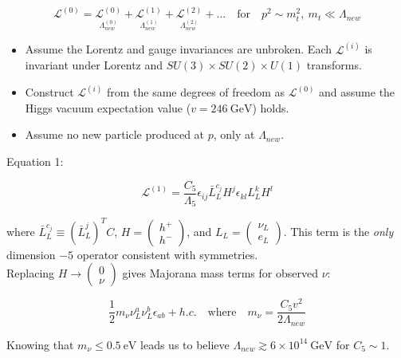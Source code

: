 \documentclass[10pt]{article}
\begin{document}
	\begin{equation}
	\mathcal{L}^{(0)} = \underset{\Lambda_{new}^{(0)}}{\mathcal{L}^{(0)}} + \underset{\Lambda_{new}^{(1)}}{\mathcal{L}^{(1)}} + \underset{\Lambda_{new}^{(2)}}{\mathcal{L}^{(2)}} + \ldots \quad \text{for}\quad p^2\sim m_t^2,\: m_t\ll\Lambda_{new}
	\end{equation}
	
	\begin{itemize}
		\item Assume the Lorentz and gauge invariances are unbroken. Each $\mathcal{L}^{(i)}$ is invariant under Lorentz and $SU(3)\times SU(2)\times U(1)$ transforms.
		\item Construct $\mathcal{L}^{(i)}$ from the same degrees of freedom as $\mathcal{L}^{(0)}$ and assume the Higgs vacuum expectation value ($v=246\:\text{GeV}$) holds.
		\item Assume no new particle produced at $p$, only at $\Lambda_{new}$.
	\end{itemize}
	
	Equation 1:
	
	\begin{equation}
		\mathcal{L}^{(1)} = \frac{C_5}{\Lambda_5}\epsilon_{ij}\bar{L}_L^{c_j}H^j\epsilon_{kl}L_L^kH^l
	\end{equation}
	
	where $\bar{L}_L^{c_j} \equiv \left(\bar{L}_L^{j}\right)^TC$, $H=\begin{pmatrix}h^+\\h^-\end{pmatrix}$, and $L_L=\begin{pmatrix}\nu_L\\e_L\end{pmatrix}$. This term is the \emph{only} dimension $-5$ operator consistent with symmetries.\\
	Replacing $H\rightarrow\begin{pmatrix}0\\\nu\end{pmatrix}$ gives Majorana mass terms for observed $\nu$:
	
	\begin{equation}
		\frac{1}{2}m_\nu\nu_L^a\nu_L^b\epsilon_{ab} + h.c. \quad\text{where}\quad m_\nu = \frac{C_5 v^2}{2\Lambda_{new}}
	\end{equation}
	
	Knowing that $m_\nu \leq 0.5\:\text{eV}$ leads us to believe $\Lambda_{new} \gtrsim 6\times 10^{14}\:\text{GeV}$ for $C_5\sim1$.\\
	
\end{document}
